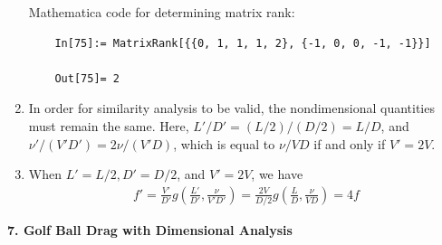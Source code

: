 \documentclass{article}
\theoremstyle{definition}
\newcommand{\f}[2]{\frac{#1}{#2}}
\newcommand{\lp}{\left(}
\newcommand{\rp}{\right)}
\begin{document}
\begin{enumerate}[label=(\alph*)]
	
	Mathematica code for determining matrix rank:
	\begin{lstlisting}
	In[75]:= MatrixRank[{{0, 1, 1, 1, 2}, {-1, 0, 0, -1, -1}}]
	
	Out[75]= 2
	\end{lstlisting}
	
	
	\item In order for similarity analysis to be valid, the nondimensional quantities must remain the same. Here, $L'/D' = (L/2)/(D/2) = L/D$, and $\nu'/(V'D') = 2\nu/(V'D)$, which is equal to $\nu/VD$ if and only if $\boxed{V' = 2V}$. 
	
	\item When $L' = L/2, D' = D/2$, and $V' = 2V$, we have
	\begin{align*}
	f' = \f{V'}{D'} g\lp \f{L'}{D'}, \f{\nu}{V'D'} \rp = \f{2V}{D/2} g\lp \f{L}{D}, \f{\nu}{VD} \rp = \boxed{4f}
	\end{align*}
\end{enumerate}



\noindent \textbf{7. Golf Ball Drag with Dimensional Analysis}
\end{document}
